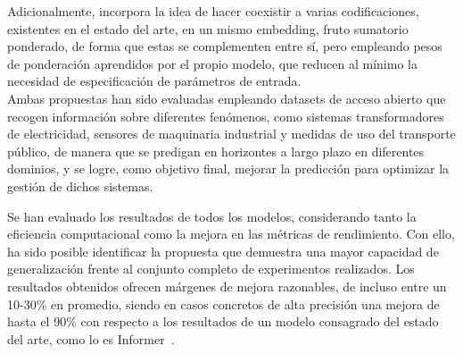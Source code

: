 Adicionalmente, incorpora la idea de hacer coexistir a varias codificaciones, existentes en el estado del arte, en un mismo embedding, fruto sumatorio ponderado, de forma que estas se complementen entre sí, pero empleando pesos de ponderación aprendidos por el propio modelo, que reducen al mínimo la necesidad de especificación de parámetros de entrada.\\
Ambas propuestas han sido evaluadas empleando datasets de acceso abierto que recogen información sobre diferentes fenómenos, como sistemas transformadores de electricidad, sensores de maquinaria industrial y medidas de uso del transporte público, de manera que se predigan en horizontes a largo plazo en diferentes dominios, y se logre, como objetivo final, mejorar la predicción para optimizar la gestión de dichos sistemas.\vspace{0.35em}

Se han evaluado los resultados de todos los modelos, considerando tanto la eficiencia computacional como la mejora en las métricas de rendimiento. Con ello, ha sido posible identificar la propuesta que demuestra una mayor capacidad de generalización frente al conjunto completo de experimentos realizados. Los resultados obtenidos ofrecen márgenes de mejora razonables, de incluso entre un 10-30\%  en promedio, siendo en casos concretos de alta precisión una mejora de hasta el 90\% con respecto a los resultados de un modelo consagrado del estado del arte, como lo es Informer~\cite{zhou2021informerefficienttransformerlong}. 

